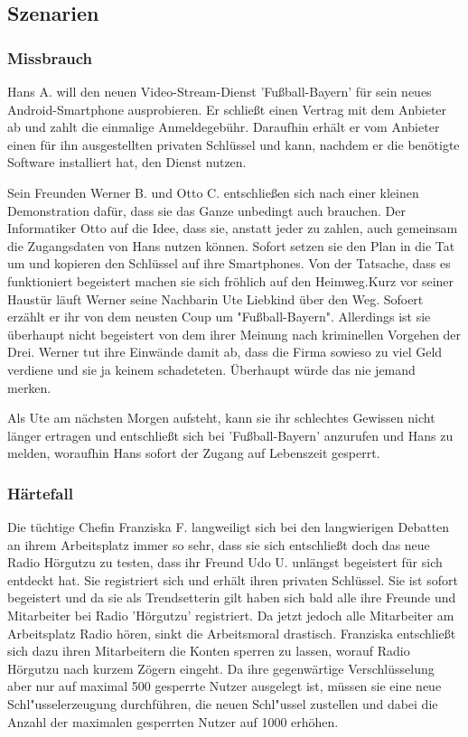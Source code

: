 \documentclass[a4paper,10pt]{scrartcl}
\begin{document}
\subsection{Szenarien}
\subsubsection{Missbrauch}
Hans A. will den neuen Video-Stream-Dienst 'Fußball-Bayern' für sein neues Android-Smartphone ausprobieren. Er schließt einen Vertrag mit dem Anbieter ab und zahlt die einmalige Anmeldegebühr. Daraufhin erhält er vom Anbieter einen für ihn ausgestellten privaten Schlüssel und kann, nachdem er die benötigte Software installiert hat, den Dienst nutzen.

Sein Freunden Werner B. und Otto C. entschließen sich nach einer kleinen Demonstration dafür, dass sie das Ganze unbedingt auch brauchen. Der Informatiker Otto auf die Idee, dass sie, anstatt jeder zu zahlen, auch gemeinsam die Zugangsdaten von Hans nutzen können. Sofort setzen sie den Plan in die Tat um und kopieren den Schlüssel auf ihre Smartphones. Von der Tatsache, dass es funktioniert begeistert machen sie sich fröhlich auf den Heimweg.Kurz vor seiner Haustür läuft Werner seine Nachbarin Ute Liebkind über den Weg. Sofoert erzählt er ihr von dem neusten Coup um "Fußball-Bayern". Allerdings ist sie überhaupt nicht begeistert von dem ihrer Meinung nach kriminellen Vorgehen der Drei. Werner tut ihre Einwände damit ab, dass die Firma sowieso zu viel Geld verdiene und sie ja keinem schadeteten. Überhaupt würde das nie jemand merken.

Als Ute am nächsten Morgen aufsteht, kann sie ihr schlechtes Gewissen nicht länger ertragen und entschließt sich bei 'Fußball-Bayern' anzurufen und Hans zu melden, woraufhin Hans sofort der Zugang auf Lebenszeit gesperrt.

\subsubsection{Härtefall}
Die tüchtige Chefin Franziska F. langweiligt sich bei den langwierigen
Debatten an ihrem Arbeitsplatz immer so sehr, dass sie sich entschließt doch
das neue Radio Hörgutzu zu testen, dass ihr Freund Udo U. unlängst
begeistert für sich entdeckt hat. Sie registriert sich und erhält ihren privaten Schlüssel.
Sie ist sofort begeistert und da sie als Trendsetterin gilt haben sich bald alle ihre Freunde
und Mitarbeiter bei Radio 'Hörgutzu' registriert. Da jetzt jedoch alle Mitarbeiter am Arbeitsplatz
Radio hören, sinkt die Arbeitsmoral drastisch. Franziska entschließt sich dazu ihren Mitarbeitern
die Konten sperren zu lassen, worauf Radio Hörgutzu nach kurzem Zögern eingeht. Da ihre
gegenwärtige Verschlüsselung aber nur auf maximal 500 gesperrte
Nutzer ausgelegt ist, müssen sie eine neue Schl"usselerzeugung durchführen, die neuen Schl"ussel
zustellen und dabei die Anzahl der maximalen gesperrten Nutzer auf 1000 erhöhen.
\end{document}
